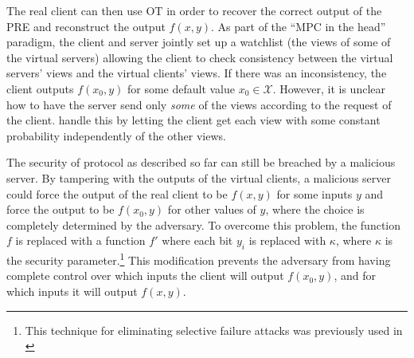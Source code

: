 \documentclass{llncs}
\newcommand{\OT}{\operatorname{OT}}
\newcommand{\bOT}[2]{\binom{#2}{#1}\text{-bit-OT}}
\newcommand{\sOT}[3]{\binom{#2}{#1}\text{-}#3\text{-string-OT}}
\newcommand{\X}{\mathcal{X}}
\renewcommand{\v}{\myvec{v}}
\begin{document}
The real client can then use OT in order to recover the correct output of the PRE and reconstruct the output $f(x,y)$. As part of the ``MPC in the head'' paradigm, the client and server jointly set up a watchlist (the views of some of the virtual servers) allowing the client to check consistency between the virtual servers' views and the virtual clients' views. If there was an inconsistency, the client outputs $f(x_0,y)$ for some default value $x_0\in\X$. However, it is unclear how to have the server send only \emph{some} of the views according to the request of the client. \citet{IKOPS11} handle this by letting the client get each view with some constant probability independently of the other views.

The security of protocol as described so far can still be breached by a malicious server. By tampering with the outputs of the virtual clients, a malicious server could force the output of the real client to be $f(x,y)$ for some inputs $y$ and force the output to be $f(x_0,y)$ for other values of $y$, where the choice is completely determined by the adversary. To overcome this problem, the function $f$ is replaced with a function $f'$ where each bit $y_i$ is replaced with  $\kappa$, where $\kappa$ is the security parameter.\footnote{This technique for eliminating selective failure attacks was previously used in \cite{Kilian88,lindell2007efficient}} This modification prevents the adversary from having complete control over which inputs the client will output $f(x_0,y)$, and for which inputs it will output $f(x,y)$.
\end{document}
